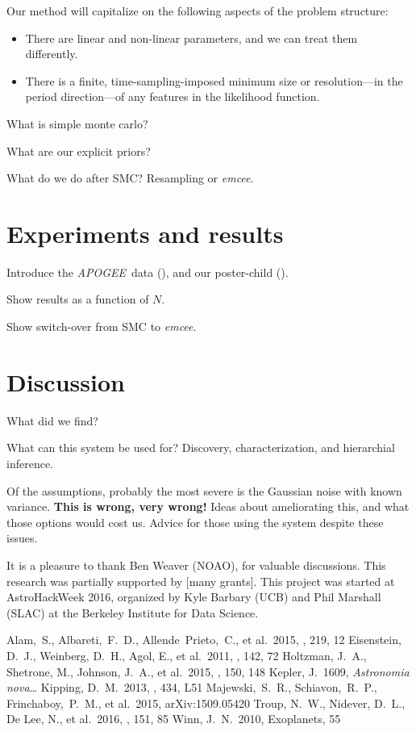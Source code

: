 \documentclass[12pt, preprint]{aastex}
\newcommand{\project}[1]{\textsl{#1}}
\newcommand{\acronym}[1]{{\small{#1}}}
\newcommand{\apogee}{\project{\acronym{APOGEE}}}
\newcommand{\emcee}{\project{emcee}}
\begin{document}
Our method will capitalize on the following aspects of the problem
structure:
\begin{itemize}
\item There are linear and non-linear parameters, and we can treat
  them differently.
\item There is a finite, time-sampling-imposed minimum size or
  resolution---in the period direction---of any features in the
  likelihood function.
\end{itemize}

What is simple monte carlo?

What are our explicit priors?

What do we do after SMC? Resampling or \emcee.

\section{Experiments and results}

Introduce the \apogee\ data (\citealt{apogee,apogeedr12,sdssiii,dr12}), and
our poster-child (\citealt{troup}).

Show results as a function of $N$.

Show switch-over from SMC to \emcee.

\section{Discussion}

What did we find?

What can this system be used for? Discovery, characterization, and
hierarchial inference.

Of the assumptions, probably the most severe is the Gaussian noise
with known variance. \textbf{This is wrong, very wrong!} Ideas about
ameliorating this, and what those options would cost us. Advice for
those using the system despite these issues.

\acknowledgements
It is a pleasure to thank
  Ben Weaver (NOAO),
for valuable discussions.
This research was partially supported by [many grants].
This project was started at AstroHackWeek 2016, organized by Kyle
Barbary (UCB) and Phil Marshall (SLAC) at the Berkeley Institute for
Data Science.

\begin{thebibliography}{99}\raggedright
{}
  Alam,~S., Albareti,~F.~D., Allende~Prieto,~C., et al.\ 2015, \apjs, 219, 12
  Eisenstein, D.~J., Weinberg, D.~H., Agol, E., et al.\ 2011, \aj, 142, 72 
  Holtzman, J.~A., Shetrone, M., Johnson, J.~A., et al.\ 2015, \aj, 150, 148
  Kepler, J.\ 1609, \textit{Astronomia nova\ldots}
  Kipping, D.~M.\ 2013, \mnras, 434, L51
  Majewski,~S.~R., Schiavon,~R.~P., Frinchaboy,~P.~M., et al.\ 2015, arXiv:1509.05420
  Troup, N.~W., Nidever, D.~L., De Lee, N., et al.\ 2016, \aj, 151, 85 
  Winn, J.~N.\ 2010, Exoplanets, 55 
\end{thebibliography}
\end{document}
